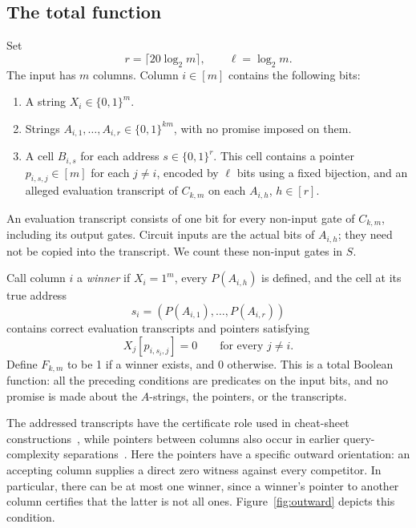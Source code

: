 \documentclass[11pt]{article}
\theoremstyle{definition}
\newcommand{\bits}{\{0,1\}}
\begin{document}
\subsection{The total function}

Set
\begin{equation}\label{eq:r-def}
 r=\lceil20\log_2m\rceil,
 \qquad \ell=\log_2m.
\end{equation}
The input has $m$ columns.  Column $i\in[m]$ contains the following bits:
\begin{enumerate}
 \item A string $X_i\in\bits^m$.
 \item Strings $A_{i,1},\ldots,A_{i,r}\in\bits^{km}$, with no promise
 imposed on them.
 \item A cell $B_{i,s}$ for each address $s\in\bits^r$.  This cell
 contains a pointer $p_{i,s,j}\in[m]$ for each $j\ne i$, encoded by
 $\ell$ bits using a fixed bijection, and an alleged evaluation transcript
 of $C_{k,m}$ on each $A_{i,h}$, $h\in[r]$.
\end{enumerate}
An evaluation transcript consists of one bit for every non-input gate of
$C_{k,m}$, including its output gates.  Circuit inputs are the actual bits
of $A_{i,h}$; they need not be copied into the transcript.  We count these
non-input gates in $S$.

Call column $i$ a \emph{winner} if $X_i=1^m$, every $P(A_{i,h})$ is
defined, and the cell at its true address
\begin{equation}\label{eq:true-address}
 s_i=(P(A_{i,1}),\ldots,P(A_{i,r}))
\end{equation}
contains correct evaluation transcripts and pointers satisfying
\begin{equation}\label{eq:outward-pointers}
 X_j[p_{i,s_i,j}]=0\qquad\text{for every }j\ne i.
\end{equation}
Define $F_{k,m}$ to be 1 if a winner exists, and 0 otherwise.  This is a
total Boolean function: all the preceding conditions are predicates on
the input bits, and no promise is made about the $A$-strings, the pointers,
or the transcripts.

The addressed transcripts have the certificate role used in cheat-sheet
constructions~\cite{ABK16}, while pointers between columns also occur in
earlier query-complexity separations~\cite{GPW15,ABBLSS17}. Here the pointers have
a specific outward orientation: an accepting column supplies a direct
zero witness against every competitor.  In particular, there can be at
most one winner, since a winner's pointer to another column certifies that
the latter is not all ones.  Figure~\ref{fig:outward} depicts this
condition.
\end{document}
